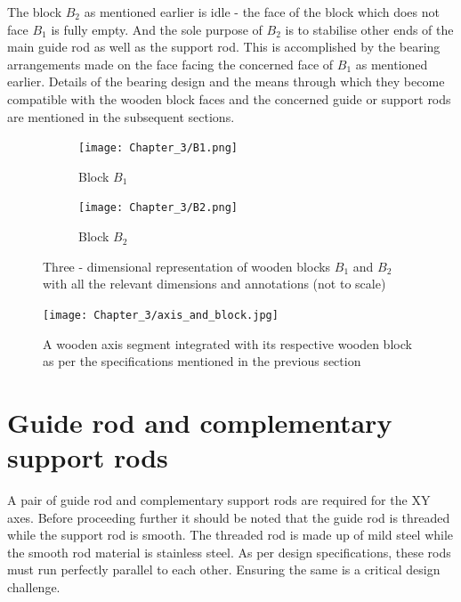 The block $B_{2}$ as mentioned earlier is idle - the face of the block which does not face $B_{1}$ is fully empty. And the sole purpose of $B_{2}$ is to stabilise other ends of the main guide rod as well as the support rod. This is accomplished by the bearing arrangements made on the face facing the concerned face of $B_{1}$ as mentioned earlier. Details of the bearing design and the means through which they become compatible with the wooden block faces and the concerned guide or support rods are mentioned in the subsequent sections.

\begin{figure}[h]

 \begin{subfigure}{0.5\textwidth}
  \hspace{8mm}
  \texttt{[image: Chapter\_3/B1.png]}
  \caption{Block $B_{1}$}
  \label{fig:b1}
 \end{subfigure}
 \begin{subfigure}{0.5\textwidth}
  \hspace{8mm}
  \texttt{[image: Chapter\_3/B2.png]}
  \caption{Block $B_{2}$}
  \label{fig:b2}
 \end{subfigure}

 \caption{Three - dimensional representation of wooden blocks $B_{1}$ and $B_{2}$ with all the relevant dimensions and annotations (not to scale)}
 \label{fig:b1b2}
\end{figure}


\begin{figure}[h]
    \centering
    \texttt{[image: Chapter\_3/axis\_and\_block.jpg]}
    \caption{A wooden axis segment integrated with its respective wooden block as per the specifications mentioned in the previous section}
    \label{fig:axis_block}
\end{figure}


\section{Guide rod and complementary support rods}

A pair of guide rod and complementary support rods are required for the XY axes. Before proceeding further it should be noted that the guide rod is threaded while the support rod is smooth. The threaded rod is made up of mild steel while the smooth rod material is stainless steel. As per design specifications, these rods must run perfectly parallel to each other. Ensuring the same is a critical design challenge. \par

